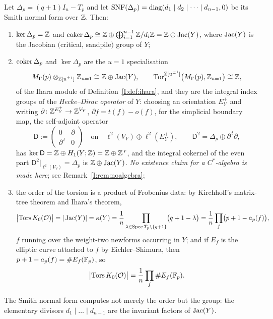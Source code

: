 \begin{theorem}\label{I:thm:structure}
Let $\Delta_p=(q+1)I_n-T_p$ and let
$\operatorname{SNF}(\Delta_p)=\mathrm{diag}(d_1\mid d_2\mid\dots\mid d_{n-1},0)$ be its Smith normal
form over $\mathbb{Z}$. Then:
\begin{enumerate}
\item[(i)] $\ker\Delta_p=\mathbb{Z}$ and
$\operatorname{coker}\Delta_p\cong\mathbb{Z}\oplus\bigoplus_{i=1}^{n-1}\mathbb{Z}/d_i\mathbb{Z}
=\mathbb{Z}\oplus\operatorname{Jac}(Y)$,
where $\operatorname{Jac}(Y)$ is the Jacobian $($critical, sandpile$)$ group of $Y$;
\item[(ii)] $\operatorname{coker}\Delta_p$ and $\ker\Delta_p$ are the $u=1$ specialisation
\[
M_\Gamma(p)\otimes_{\mathbb{Z}[u^{\pm1}]}\mathbb{Z}_{u=1}\cong\mathbb{Z}\oplus\operatorname{Jac}(Y),
\qquad
\mathrm{Tor}_1^{\mathbb{Z}[u^{\pm1}]}\bigl(M_\Gamma(p),\mathbb{Z}_{u=1}\bigr)\cong\mathbb{Z},
\]
of the Ihara module of Definition~\ref{I:def:ihara}, and they are the integral index
groups of the \emph{Hecke--Dirac operator} of $Y$: choosing an orientation $E_Y^+$ and
writing $\partial\colon\mathbb{Z}^{E_Y^+}\to\mathbb{Z}^{V_Y}$, $\partial f=t(f)-o(f)$, for the simplicial
boundary map, the self-adjoint operator
\[
\mathsf{D}:=\begin{pmatrix}0&\partial\\ \partial^{\,t}&0\end{pmatrix}
\quad\text{on}\quad \ell^2(V_Y)\oplus\ell^2(E_Y^+),
\qquad
\mathsf{D}^2=\Delta_p\oplus\partial^{\,t}\partial ,
\]
has $\ker\mathsf{D}=\mathbb{Z}\oplus H_1(Y;\mathbb{Z})=\mathbb{Z}\oplus\mathbb{Z}^{\,r}$, and the integral cokernel of
the even part $\mathsf{D}^2|_{\ell^2(V_Y)}=\Delta_p$ is $\mathbb{Z}\oplus\operatorname{Jac}(Y)$. \emph{No
existence claim for a $C^*$-algebra is made here}; see Remark~\ref{I:rem:noalgebra};
\item[(iii)] the order of the torsion is a product of Frobenius data: by Kirchhoff's
matrix-tree theorem and Ihara's theorem,
\begin{equation}\label{I:eq:torsionorder}
\bigl|\operatorname{Tors} K_0(\mathcal{O})\bigr|=|\operatorname{Jac}(Y)|=\kappa(Y)
=\frac1n\prod_{\lambda\in\operatorname{Spec} T_p\setminus\{q+1\}}\bigl(q+1-\lambda\bigr)
=\frac1n\prod_f\bigl(p+1-a_p(f)\bigr),
\end{equation}
$f$ running over the weight-two newforms occurring in $Y$; and if $E_f$ is the elliptic
curve attached to $f$ by Eichler--Shimura, then $p+1-a_p(f)=\#E_f(\mathbb{F}_p)$, so
\[
\bigl|\operatorname{Tors} K_0(\mathcal{O})\bigr|=\frac1n\prod_f\#E_f(\mathbb{F}_p).
\]
\end{enumerate}
The Smith normal form computes not merely the order but the group: the elementary
divisors $d_1\mid\dots\mid d_{n-1}$ are the invariant factors of $\operatorname{Jac}(Y)$.
\end{theorem}


